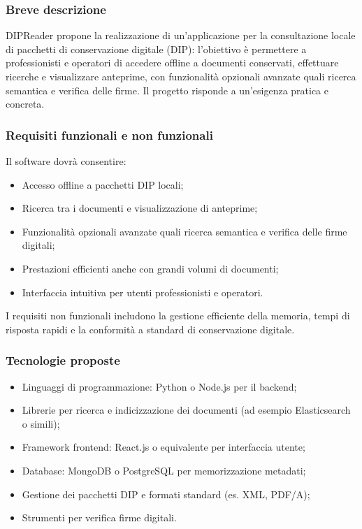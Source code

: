 \documentclass[a4paper,11pt]{article}
\begin{document}
\subsubsection{Breve descrizione}
DIPReader propone la realizzazione di un’applicazione per la consultazione locale di pacchetti di conservazione digitale (DIP): l’obiettivo è permettere a professionisti e operatori di accedere offline a documenti conservati, effettuare ricerche e visualizzare anteprime, con funzionalità opzionali avanzate quali ricerca semantica e verifica delle firme. Il progetto risponde a un’esigenza pratica e concreta.

\subsubsection{Requisiti funzionali e non funzionali}
Il software dovrà consentire:
\begin{itemize}[leftmargin=*]
    \item Accesso offline a pacchetti DIP locali;
    \item Ricerca tra i documenti e visualizzazione di anteprime;
    \item Funzionalità opzionali avanzate quali ricerca semantica e verifica delle firme digitali;
    \item Prestazioni efficienti anche con grandi volumi di documenti;
    \item Interfaccia intuitiva per utenti professionisti e operatori.
\end{itemize}
I requisiti non funzionali includono la gestione efficiente della memoria, tempi di risposta rapidi e la conformità a standard di conservazione digitale.

\subsubsection{Tecnologie proposte}
\begin{itemize}[leftmargin=*]
    \item Linguaggi di programmazione: Python o Node.js per il backend;
    \item Librerie per ricerca e indicizzazione dei documenti (ad esempio Elasticsearch o simili);
    \item Framework frontend: React.js o equivalente per interfaccia utente;
    \item Database: MongoDB o PostgreSQL per memorizzazione metadati;
    \item Gestione dei pacchetti DIP e formati standard (es. XML, PDF/A);
    \item Strumenti per verifica firme digitali.
\end{itemize}
\end{document}
